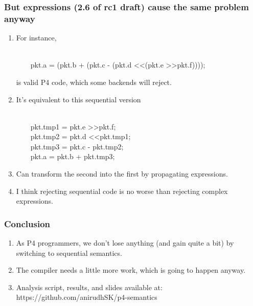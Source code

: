 \documentclass[aspectratio=169]{beamer}
\begin{document}
\begin{frame}[fragile]
  \frametitle{But expressions (2.6 of rc1 draft) cause the same problem anyway}
    \begin{enumerate}
    \item<1-> For instance,
      \begin{texttt} \\
      \ \ \ \ pkt.a = (pkt.b + (pkt.c - (pkt.d \textless\textless (pkt.e \textgreater\textgreater pkt.f)))); \\
      \end{texttt}
      is valid P4 code, which some backends will reject.
    \item<2-> It's equivalent to this sequential version
      \begin{texttt} \\
      \ \ \ \ pkt.tmp1 = pkt.e \textgreater\textgreater pkt.f; \\
      \ \ \ \ pkt.tmp2 = pkt.d \textless\textless pkt.tmp1; \\
      \ \ \ \ pkt.tmp3 = pkt.c - pkt.tmp2; \\
      \ \ \ \ pkt.a    = pkt.b + pkt.tmp3; \\
    \end{texttt}
   \item<3-> Can transform the second into the first by propagating expressions.
   \item<4-> I think rejecting sequential code is no worse than rejecting complex expressions.
  \end{enumerate}
\end{frame}

\begin{frame}[fragile]
  \frametitle{Conclusion}
  \begin{enumerate}
    \item<1-> As P4 programmers, we don't lose anything (and gain quite a bit) by switching to sequential semantics.
    \item<2-> The compiler needs a little more work, which is going to happen anyway.
    \item<3-> Analysis script, results, and slides available at: https://github.com/anirudhSK/p4-semantics
  \end{enumerate}
\end{frame}
\end{document}
